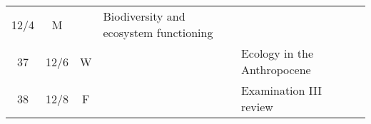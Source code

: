 \documentclass[]{article}
\begin{document}
\begin{longtable}[]{@{}ccclll@{}}
\begin{minipage}[t]{0.08\columnwidth}
12/4\strut
\end{minipage} & \begin{minipage}[t]{0.07\columnwidth}\centering\strut
M\strut
\end{minipage} & \begin{minipage}[t]{0.10\columnwidth}\raggedright\strut
\strut
\end{minipage} & \begin{minipage}[t]{0.12\columnwidth}\raggedright\strut
Biodiversity and ecosystem functioning\strut
\end{minipage} & \begin{minipage}[t]{0.12\columnwidth}\raggedright\strut
\strut
\end{minipage}\tabularnewline
\begin{minipage}[t]{0.13\columnwidth}\centering\strut
37\strut
\end{minipage} & \begin{minipage}[t]{0.08\columnwidth}\centering\strut
12/6\strut
\end{minipage} & \begin{minipage}[t]{0.07\columnwidth}\centering\strut
W\strut
\end{minipage} & \begin{minipage}[t]{0.10\columnwidth}\raggedright\strut
\strut
\end{minipage} & \begin{minipage}[t]{0.12\columnwidth}\raggedright\strut
Ecology in the Anthropocene\strut
\end{minipage} & \begin{minipage}[t]{0.12\columnwidth}\raggedright\strut
\strut
\end{minipage}\tabularnewline
\begin{minipage}[t]{0.13\columnwidth}\centering\strut
38\strut
\end{minipage} & \begin{minipage}[t]{0.08\columnwidth}\centering\strut
12/8\strut
\end{minipage} & \begin{minipage}[t]{0.07\columnwidth}\centering\strut
F\strut
\end{minipage} & \begin{minipage}[t]{0.10\columnwidth}\raggedright\strut
\strut
\end{minipage} & \begin{minipage}[t]{0.12\columnwidth}\raggedright\strut
Examination III review\strut
\end{minipage} & \begin{minipage}[t]{0.12\columnwidth}\raggedright\strut

\end{minipage}
\end{longtable}
\end{document}
